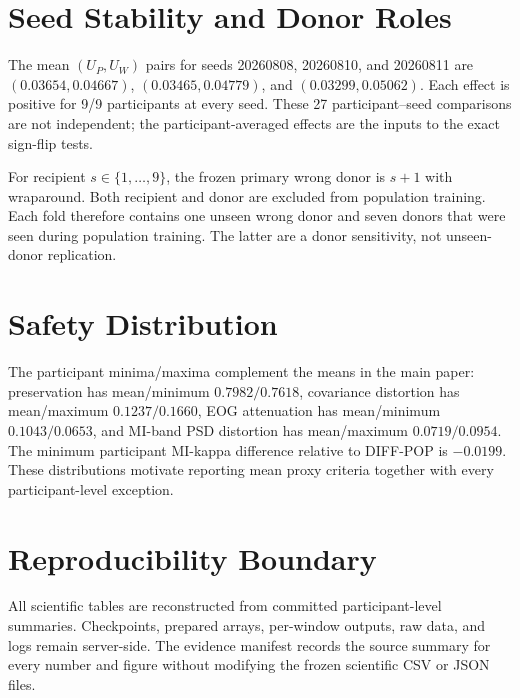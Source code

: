 \appendix

\section{Seed Stability and Donor Roles}
\label{app:seed_donor}

The mean $(U_P,U_W)$ pairs for seeds 20260808, 20260810, and 20260811 are
$(0.03654,0.04667)$, $(0.03465,0.04779)$, and $(0.03299,0.05062)$.
Each effect is positive for 9/9 participants at every seed. These 27
participant--seed comparisons are not independent; the participant-averaged
effects are the inputs to the exact sign-flip tests.

For recipient $s\in\{1,\ldots,9\}$, the frozen primary wrong donor is
$s+1$ with wraparound. Both recipient and donor are excluded from population
training. Each fold therefore contains one unseen wrong donor and seven donors
that were seen during population training. The latter are a donor sensitivity,
not unseen-donor replication.

\section{Safety Distribution}
\label{app:safety}

The participant minima/maxima complement the means in the main paper:
preservation has mean/minimum $0.7982/0.7618$, covariance distortion has
mean/maximum $0.1237/0.1660$, EOG attenuation has mean/minimum
$0.1043/0.0653$, and MI-band PSD distortion has mean/maximum
$0.0719/0.0954$. The minimum participant MI-kappa difference relative to
DIFF-POP is $-0.0199$. These distributions motivate reporting mean proxy
criteria together with every participant-level exception.

\section{Reproducibility Boundary}
\label{app:reproducibility}

All scientific tables are reconstructed from committed participant-level
summaries. Checkpoints, prepared arrays, per-window outputs, raw data, and logs
remain server-side. The evidence manifest records the source summary for every
number and figure without modifying the frozen scientific CSV or JSON files.
